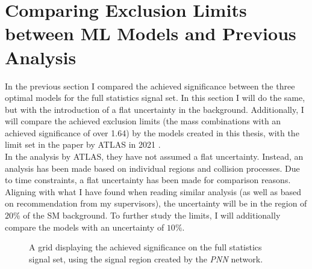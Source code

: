 \section{Comparing Exclusion Limits between ML Models and Previous Analysis}
In the previous section I compared the achieved significance between 
the three optimal models for the full statistics signal set. In this section 
I will do the same, but with the introduction of a flat uncertainty in the background.
Additionally, I will compare the achieved exclusion limits (the mass combinations with an achieved 
significance of over 1.64) by the models created in this thesis, with the limit set in the paper by ATLAS 
in 2021 \cite{atlas_search_2021}.
\\
In the analysis by ATLAS, they have not assumed a flat uncertainty. Instead, an analysis has been made based on 
individual regions and collision processes. Due to time constraints, a flat uncertainty has been made for comparison 
reasons. Aligning with what I have found when reading similar analysis (as well as based on recommendation from my supervisors), 
the uncertainty will be in the region of $20\%$ of the \ac{SM} background. To further study the limits, I will additionally 
compare the models with an uncertainty of $10\%$.\\
\begin{figure}
    \caption{A grid displaying the achieved significance on the full statistics signal set, using the signal region 
    created by the \emph{PNN} network.}
    \label{fig:compLimit20}
\end{figure}
